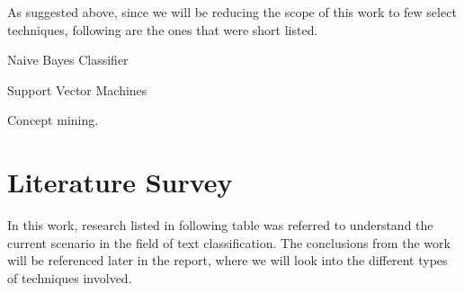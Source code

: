 \documentclass[12pt]{book}
\begin{document}
As suggested above, since we will be reducing the scope of this work to few select techniques, following are the ones that were short listed.
\begin{itemize*}
  \item Naive Bayes Classifier
  \item Support Vector Machines
  \item Concept mining.
\end{itemize*}


\chapter{Literature Survey}

In this work, research listed in following table was referred to understand the current scenario in the field of text classification.
The conclusions from the work will be referenced later in the report, where we will look into the different types of techniques involved.
\end{document}
